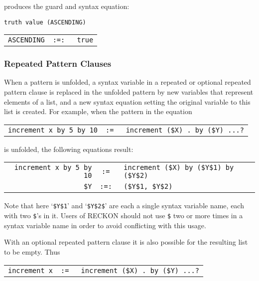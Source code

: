 \documentclass[12pt]{article}
\newcommand{\TILDE}{\usebox{\TILDEBOX}}
\begin{document}
produces the guard and syntax equation:

\begin{center}
\verb/truth value (ASCENDING)/ \\
\begin{tabular}{rcl}
\verb/ASCENDING/ & \tt :=: & \verb/true/ \\
\end{tabular}
\end{center}



\subsubsection{Repeated Pattern Clauses}
\label{REPEATED-PATTERN-CLAUSES}

When a pattern is unfolded, a syntax variable in a
repeated or optional repeated pattern clause is replaced
in the unfolded pattern by new variables that represent elements of a list,
and a new syntax equation setting the original variable to this list
is created.  For example, when the pattern in the equation

\begin{center}
\begin{tabular}{rcl}
\verb/increment x by 5 by 10/ & \tt :=\TILDE
			      & \verb/increment ($X) . by ($Y) ...?/ \\
\end{tabular}
\end{center}

is unfolded, the following equations result:

\begin{center}
\begin{tabular}{rcl}
\verb/increment x by 5 by 10/ & \tt :=\TILDE
			      & \verb/increment ($X) by ($Y$1) by ($Y$2)/ \\
\verb/$Y/ & \tt :=: & \verb|($Y$1, $Y$2)|
\end{tabular}
\end{center}

Note that here `\verb|$Y$1|' and `\verb|$Y$2$|' are each a single syntax
variable name, each with two \verb|$|'s in it.  Users of RECKON should
not use \verb|$| two or more times in
a syntax variable name in order to avoid conflicting
with this usage.

With an optional repeated pattern clause it is also possible for the
resulting list to be empty.  Thus

\begin{center}
\begin{tabular}{rcl}
\verb/increment x/ & \tt :=\TILDE
			      & \verb/increment ($X) . by ($Y) ...?/ \\
\end{tabular}
\end{center}
\end{document}
